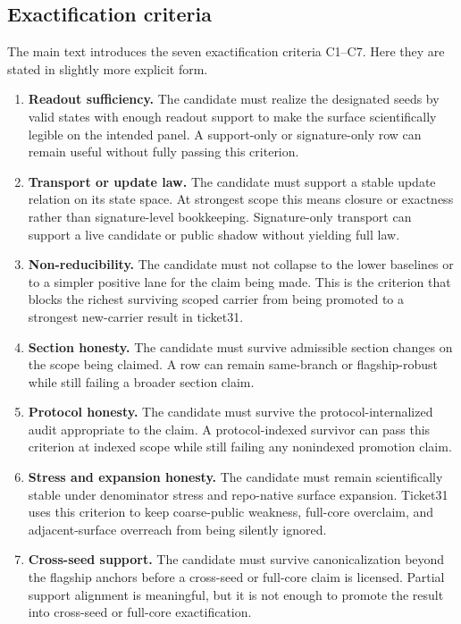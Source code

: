 \documentclass[11pt]{article}
\theoremstyle{definition}
\begin{document}
\subsection{Exactification criteria}

The main text introduces the seven exactification criteria C1--C7. Here they are stated in
slightly more explicit form.

\begin{enumerate}[label=\textbf{C\arabic*.}, leftmargin=*]
\item \textbf{Readout sufficiency.} The candidate must realize the designated seeds by
valid states with enough readout support to make the surface scientifically legible on the
intended panel. A support-only or signature-only row can remain useful without fully
passing this criterion.

\item \textbf{Transport or update law.} The candidate must support a stable update
relation on its state space. At strongest scope this means closure or exactness rather
than signature-level bookkeeping. Signature-only transport can support a live candidate or
public shadow without yielding full law.

\item \textbf{Non-reducibility.} The candidate must not collapse to the lower baselines or
to a simpler positive lane for the claim being made. This is the criterion that blocks the
richest surviving scoped carrier from being promoted to a strongest new-carrier result in
ticket31.

\item \textbf{Section honesty.} The candidate must survive admissible section changes on
the scope being claimed. A row can remain same-branch or flagship-robust while still
failing a broader section claim.

\item \textbf{Protocol honesty.} The candidate must survive the protocol-internalized
audit appropriate to the claim. A protocol-indexed survivor can pass this criterion at
indexed scope while still failing any nonindexed promotion claim.

\item \textbf{Stress and expansion honesty.} The candidate must remain scientifically
stable under denominator stress and repo-native surface expansion. Ticket31 uses this
criterion to keep coarse-public weakness, full-core overclaim, and adjacent-surface
overreach from being silently ignored.

\item \textbf{Cross-seed support.} The candidate must survive canonicalization beyond the
flagship anchors before a cross-seed or full-core claim is licensed. Partial support
alignment is meaningful, but it is not enough to promote the result into cross-seed or
full-core exactification.
\end{enumerate}
\end{document}
